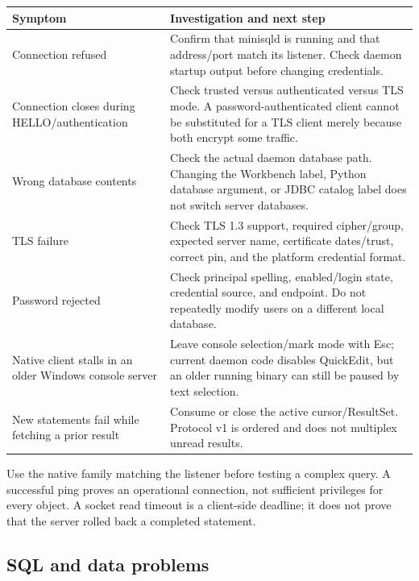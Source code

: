 \begin{longtable}{p{.3\linewidth}p{.61\linewidth}}
\toprule Symptom & Investigation and next step \\\midrule
Connection refused & Confirm that minisqld is running and that address/port match its listener. Check daemon startup output before changing credentials. \\
Connection closes during HELLO/authentication & Check trusted versus authenticated versus TLS mode. A password-authenticated client cannot be substituted for a TLS client merely because both encrypt some traffic. \\
Wrong database contents & Check the actual daemon database path. Changing the Workbench label, Python database argument, or JDBC catalog label does not switch server databases. \\
TLS failure & Check TLS 1.3 support, required cipher/group, expected server name, certificate dates/trust, correct pin, and the platform credential format. \\
Password rejected & Check principal spelling, enabled/login state, credential source, and endpoint. Do not repeatedly modify users on a different local database. \\
Native client stalls in an older Windows console server & Leave console selection/mark mode with Esc; current daemon code disables QuickEdit, but an older running binary can still be paused by text selection. \\
New statements fail while fetching a prior result & Consume or close the active cursor/ResultSet. Protocol v1 is ordered and does not multiplex unread results. \\
\bottomrule
\end{longtable}

Use the native  family matching the listener before testing a complex query. A successful ping proves an operational connection, not sufficient privileges for every object. A socket read timeout is a client-side deadline; it does not prove that the server rolled back a completed statement.

\subsection{SQL and data problems}


